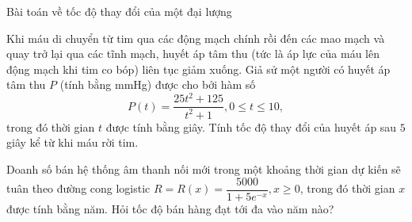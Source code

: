 \begin{dang}{Bài toán về tốc độ thay đổi của một đại lượng}
\end{dang}

\begin{vd}
	Khi máu di chuyển từ tim qua các động mạch chính rồi đến các mao mạch và quay trở lại qua các tĩnh mạch, huyết áp tâm thu (tức là áp lực của máu lên động mạch khi tim co bóp) liên tục giảm xuống. Giả sử một người có huyết áp tâm thu $P$ (tính bằng mmHg) được cho bởi hàm số
	$$
	P(t)=\dfrac{25 t^2+125}{t^2+1}, 0 \leq t \leq 10,
	$$
	trong đó thời gian $t$ được tính bằng giây. Tính tốc độ thay đổi của huyết áp sau $5$ giây kể từ khi máu rời tim.
\end{vd}
\begin{vd}
	Doanh số bán hệ thống âm thanh nối mới trong một khoảng thời gian dự kiến sẽ tuân theo đường cong logistic $R=R(x)=\dfrac{5000}{1+5 e^{-x}}, x \geq 0$, trong đó thời gian $x$ được tính bằng năm. Hỏi tốc độ bán hàng đạt tới đa vào năm nào?
\end{vd}
